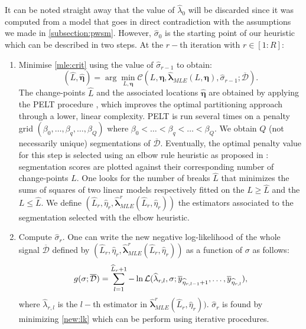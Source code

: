 It can be noted straight away that the value of $\widehat{\lambda}_0$ will be discarded since it was computed from a model that goes in direct contradiction with the assumptions we made in \ref{subsection:pwsm}. However, $\widehat{\sigma}_0$ is the starting point of our heuristic which can be described in two steps.
At the $r-$th iteration with $r \in [1:R]$:
\begin{enumerate}
    \item Minimise \ref{mle:crit} using the value of $\widehat{\sigma}_{r-1}$ to obtain:  
\begin{equation}\label{mle:crit2}
(\widehat{L}, \widehat{\bm{\eta}}) = \arg \min_{L, \bm{\eta}} \mathcal{C}(L,  \bm{\eta}, \widehat{\bm{\lambda}}_{MLE}(L, \bm{\eta}),\widehat{\sigma}_{r-1};   \overline{\mathcal{D}}).
\end{equation}
The change-points $\widehat{L}$ and the associated locations $\widehat{\bm{\eta}}$ are obtained by applying the PELT procedure \cite{Killick2012}, which improves the optimal partitioning approach through a lower, linear complexity. PELT is run several times on a penalty grid $(\beta_0,\dots,\beta_q,\dots,\beta_{Q})$ where $\beta_0<\dots<\beta_{q}<\dots<\beta_{Q}$. We obtain $Q$ (not necessarily unique) segmentations of $\overline{\mathcal{D}}$. Eventually, the optimal penalty value for this step is selected using an elbow rule heuristic as proposed in \cite{lung2015}: segmentation scores are plotted against their corresponding number of change-points $L$. One looks for the number of breaks $\hat L$ that minimizes the sums of squares of two linear models respectively fitted on the $L \geq \hat L$ and the $L \leq \hat L$. We define $(\widehat{L}_r,\widehat{\eta}_r,\widehat{\bm{\lambda}}^r_{MLE}(\widehat{L}_r,\widehat{\eta}_r))$ the estimators associated to the segmentation selected with the elbow heuristic. 
\item Compute $\widehat{\sigma}_r$. One can write the new negative log-likelihood of the whole signal $\overline{\mathcal{D}}$ defined by $(\widehat{L}_r,\widehat{\eta}_r,\widehat{\bm{\lambda}}^r_{MLE}(\widehat{L}_r,\widehat{\eta}_r))$ as a function of $\sigma$ as follows:
\begin{equation}\label{new:lk}
g(\sigma;   \overline{\mathcal{D}})=\sum_{l=1}^{\widehat{L}_r+1}  -\ln \mathcal L(\widehat{\lambda}_{r,l},\sigma; \overline{y}_{\widehat{\eta}_{r,l-1}+1}, \ldots, \overline{y}_{\widehat{\eta}_{r,l}}),
\end{equation}
where $\widehat{\lambda}_{r,l}$ is the $l-$th estimator in $\widehat{\bm{\lambda}}^r_{MLE}(\widehat{L}_r,\widehat{\eta}_r))$. $\widehat{\sigma}_r$ is found by minimizing \ref{new:lk} which can be perform using iterative procedures. 
\end{enumerate}

